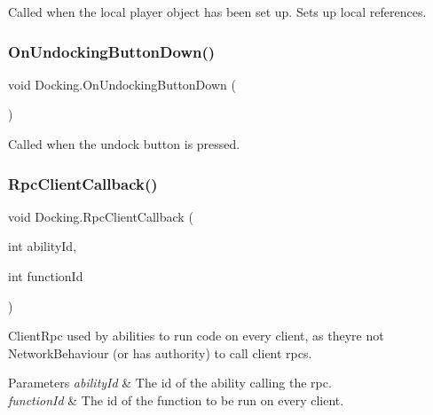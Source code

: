 Called when the local player object has been set up. Sets up local references. 

\hypertarget{class_docking_aaeaafb7445f24b6f8ca47d75f58e6e88}{}\label{class_docking_aaeaafb7445f24b6f8ca47d75f58e6e88} 
\subsubsection{\texorpdfstring{On\+Undocking\+Button\+Down()}{OnUndockingButtonDown()}}
{\footnotesize\ttfamily void Docking.\+On\+Undocking\+Button\+Down (\begin{DoxyParamCaption}{ }\end{DoxyParamCaption})}



Called when the undock button is pressed. 

\hypertarget{class_docking_af5968322d054d0ed72908ffcd323fc65}{}\label{class_docking_af5968322d054d0ed72908ffcd323fc65} 
\subsubsection{\texorpdfstring{Rpc\+Client\+Callback()}{RpcClientCallback()}}
{\footnotesize\ttfamily void Docking.\+Rpc\+Client\+Callback (\begin{DoxyParamCaption}\item[{int}]{ability\+Id,  }\item[{int}]{function\+Id }\end{DoxyParamCaption})}



Client\+Rpc used by abilities to run code on every client, as they\textquotesingle{}re not Network\+Behaviour (or has authority) to call client rpcs. 


\begin{DoxyParams}{Parameters}
{\em ability\+Id} & The id of the ability calling the rpc.\\
\hline
{\em function\+Id} & The id of the function to be run on every client.\\
\hline
\end{DoxyParams}
\hypertarget{class_docking_af9eb2fc63cb3035d9931fe5ec9f244aa}{}\label{class_docking_af9eb2fc63cb3035d9931fe5ec9f244aa} 

